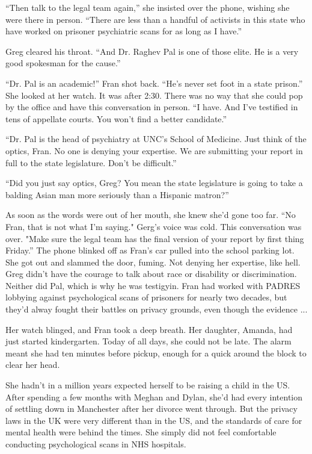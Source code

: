 \documentclass{article}
\begin{document}
“Then talk to the legal team again,” she insisted over the phone, wishing she were there in person. “There are less than a handful of activists in this state who have worked on prisoner psychiatric scans for as long as I have.” 

Greg cleared his throat. “And Dr. Raghev Pal is one of those elite. He is a very good spokesman for the cause.”

“Dr. Pal is an academic!” Fran shot back. “He’s never set foot in a state prison.” She looked at her watch. It was after 2:30. There was no way that she could pop by the office and have this conversation in person. “I have. And I’ve testified in tens of appellate courts. You won’t find a better candidate.”

“Dr. Pal is the head of psychiatry at UNC’s School of Medicine. Just think of the optics, Fran. No one is denying your expertise. We are submitting your report in full to the state legislature. Don’t be difficult.”

“Did you just say optics, Greg? You mean the state legislature is going to take a balding Asian man more seriously than a Hispanic matron?” 

As soon as the words were out of her mouth, she knew she’d gone too far. “No Fran, that is not what I’m saying." Gerg's voice was cold. This conversation was over. "Make sure the legal team has the final version of your report by first thing Friday.” The phone blinked off as Fran’s car pulled into the school parking lot. She got out and slammed the door, fuming. Not denying her expertise, like hell. Greg didn't have the courage to talk about race or disability or discrimination. Neither did Pal, which is why he was testigyin. Fran had worked with PADRES lobbying against psychological scans of prisoners for nearly two decades, but they'd alway fought their battles on privacy grounds, even though the evidence ...

Her watch blinged, and Fran took a deep breath. Her daughter, Amanda, had just started kindergarten. Today of all days, she could not be late. The alarm meant she had ten minutes before pickup, enough for a quick around the block to clear her head.

She hadn’t in a million years expected herself to be raising a child in the US. After spending a few months with Meghan and Dylan, she’d had every intention of settling down in Manchester after her divorce went through. But the privacy laws in the UK were very different than in the US, and the standards of care for mental health were behind the times. She simply did not feel comfortable conducting psychological scans in NHS hospitals. 
\end{document}
